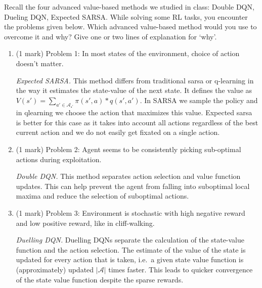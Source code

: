 \documentclass[addpoints,12pt,solution]{exam}
\begin{document}
    \begin{questions}

        \question[3] Recall the four advanced value-based methods we studied in class: Double DQN, Dueling DQN, Expected SARSA.
        While solving some RL tasks, you encounter the problems given below. Which advanced value-based method would you use to overcome it and why? Give one or two lines of explanation for `why’.
        \begin{enumerate}[label=(\alph*)]
            \item (1 mark) Problem 1: In most states of the environment, choice of action doesn’t matter.
            \begin{solution}
                \emph{Expected SARSA.} This method differs from traditional sarsa or q-learning in the way it estimates the state-value of the next state.
                It defines the value as $V(s') = \sum_{a'\in\mathcal{A_{s'}}}\pi(s', a) * q(s', a')$.
                In SARSA we sample the policy and in qlearning we choose the action that maximizes this value.
                Expected sarsa is better for this case as it takes into account all actions regardless of the best current action and we do not easily get fixated on a single action.

            \end{solution}
            \item (1 mark) Problem 2: Agent seems to be consistently picking sub-optimal actions during exploitation.
            \begin{solution}
                \emph{Double DQN.} This method separates action selection and value function updates.
                This can help prevent the agent from falling into suboptimal local maxima and reduce the selection of
                suboptimal actions.
            \end{solution}
            \item (1 mark) Problem 3: Environment is stochastic with high negative reward and low positive reward, like in cliff-walking.
            \begin{solution}
                \emph{Duelling DQN.} Duelling DQNs separate the calculation of the state-value function and the action selection.
                The estimate of the value of the state is updated for every action that is taken,
                i.e.\ a given state value function is (approximately) updated $|\mathcal{A}|$ times faster.
                This leads to quicker convergence of the state value function despite the sparse rewards.
            \end{solution}
        \end{enumerate}



\end{questions}
\end{document}
